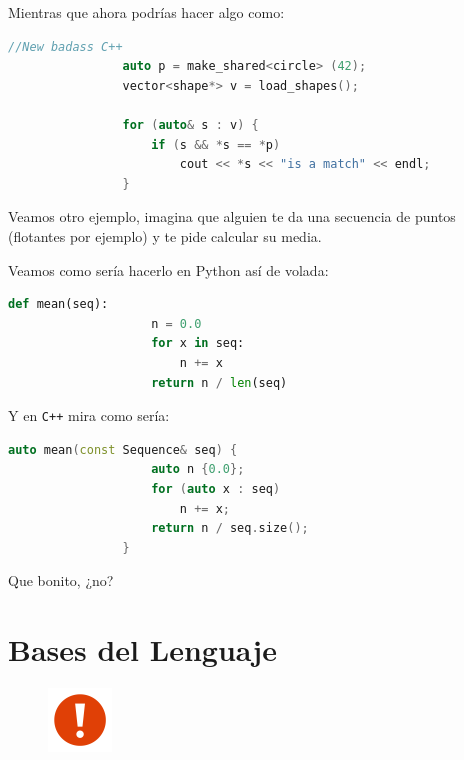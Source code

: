 \documentclass[12pt, fleqn]{report}                             %
\theoremstyle{break}                                            %
\newcommand \Cpp  {\texttt{C++} }                               %
\begin{document}
            Mientras que ahora podrías hacer algo como:
            \begin{lstlisting}[language=C++, gobble=16]
                //New badass C++
                auto p = make_shared<circle> (42);
                vector<shape*> v = load_shapes();

                for (auto& s : v) {
                    if (s && *s == *p)
                        cout << *s << "is a match" << endl;
                }
            \end{lstlisting}

            \clearpage

            Veamos otro ejemplo, imagina que alguien te da una secuencia de 
            puntos (flotantes por ejemplo) y te pide calcular su media.

            Veamos como sería hacerlo en Python así de volada:
            \begin{lstlisting}[language=python, gobble=16]
                def mean(seq):
                    n = 0.0
                    for x in seq:
                        n += x
                    return n / len(seq)
            \end{lstlisting}

            Y en \Cpp mira como sería:
            \begin{lstlisting}[language=C++, gobble=16]
                auto mean(const Sequence& seq) {
                    auto n {0.0};
                    for (auto x : seq)
                        n += x;
                    return n / seq.size();
                }
            \end{lstlisting}

            Que bonito, ¿no?
            \cite{ModernCppWhatYouNeedToKnow}


    \clearpage
    \chapter{Bases del Lenguaje}

        \begin{figure}
            \centering
            \includegraphics[width=0.15\textwidth]{Warning}
        \end{figure}
\end{document}
